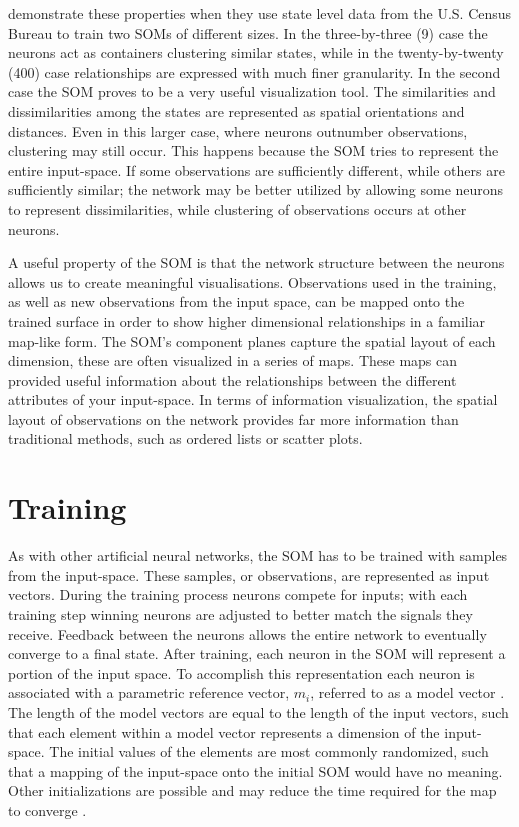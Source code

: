 \cite{skupin08} demonstrate these properties when they use state level data
from the U.S. Census Bureau to train two SOMs of different sizes.  In the
three-by-three (9) case the neurons act as containers clustering similar
states, while in the twenty-by-twenty (400) case relationships are expressed
with much finer granularity.  In the second case the SOM proves to be a very
useful visualization tool.  The similarities and dissimilarities among the
states are represented as spatial orientations and distances.  Even in this
larger case, where neurons outnumber observations, clustering may still occur.
This happens because the SOM tries to represent the entire input-space.  If
some observations are sufficiently different, while others are sufficiently
similar; the network may be better utilized by allowing some neurons to
represent dissimilarities, while clustering of observations occurs at other
neurons.

A useful property of the SOM is that the network structure between the neurons
allows us to create meaningful visualisations.  Observations used in the
training, as well as new observations from the input space, can be mapped
onto the trained surface in order to show higher dimensional relationships in a
familiar map-like form. The SOM's component planes capture the spatial layout
of each dimension, these are often visualized in a series of maps.  These
maps can provided useful information about the relationships between the
different attributes of your input-space.  In terms of information
visualization, the spatial layout of observations on the network provides far
more information than traditional methods, such as ordered lists or scatter
plots.

\section{Training}
\label{bg:train}
As with other artificial neural networks, the SOM has to be trained with
samples from the input-space.  These samples, or observations, are represented
as input vectors.  During the training process neurons compete for inputs;
with each training step winning neurons are adjusted to better match the
signals they receive.  Feedback between the neurons allows the entire network to
eventually converge to a final state. After training, each neuron in the SOM
will represent a portion of the input space.  To accomplish this
representation each neuron is associated with a parametric reference vector,
\(m_i\), referred to as a model vector \citep{Kohonen2000}.  The length of the
model vectors are equal to the length of the input vectors, such that each
element within a model vector represents a dimension of the input-space.  The
initial values of the elements are most commonly randomized, such that a
mapping of the input-space onto the initial SOM would have no meaning. Other
initializations are possible and may reduce the time required for the map to
converge \citep{Kohonen2000}.

